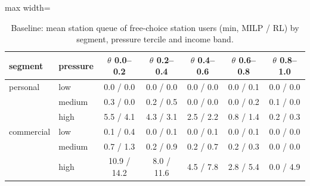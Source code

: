 \begin{table}[H]\centering
\scriptsize
\caption{Baseline: mean station queue of free-choice station users (min, MILP / RL) by segment, pressure tercile and income band.}\label{tab:pressbandq}
\begin{adjustbox}{max width=\textwidth}\begin{tabular}{llccccc}\toprule
segment & pressure & $\theta$ 0.0--0.2 & $\theta$ 0.2--0.4 & $\theta$ 0.4--0.6 & $\theta$ 0.6--0.8 & $\theta$ 0.8--1.0 \\ \midrule
personal & low & 0.0 / 0.0 & 0.0 / 0.0 & 0.0 / 0.0 & 0.0 / 0.1 & 0.0 / 0.0 \\
 & medium & 0.3 / 0.0 & 0.2 / 0.5 & 0.0 / 0.0 & 0.0 / 0.2 & 0.1 / 0.0 \\
 & high & 5.5 / 4.1 & 4.3 / 3.1 & 2.5 / 2.2 & 0.8 / 1.4 & 0.2 / 0.3 \\
commercial & low & 0.1 / 0.4 & 0.0 / 0.1 & 0.0 / 0.1 & 0.0 / 0.1 & 0.0 / 0.0 \\
 & medium & 0.7 / 1.3 & 0.2 / 0.9 & 0.2 / 0.7 & 0.2 / 0.3 & 0.0 / 0.0 \\
 & high & 10.9 / 14.2 & 8.0 / 11.6 & 4.5 / 7.8 & 2.8 / 5.4 & 0.0 / 4.9 \\
\bottomrule\end{tabular}\end{adjustbox}\end{table}
